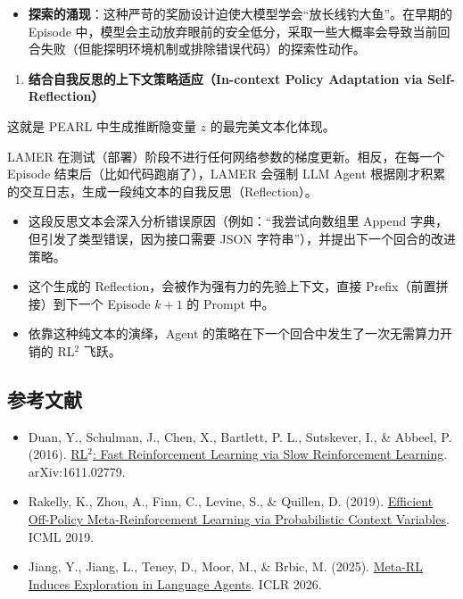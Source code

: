 \begin{itemize}
\tightlist
\item
  \textbf{探索的涌现}：这种严苛的奖励设计迫使大模型学会``放长线钓大鱼''。在早期的 Episode 中，模型会主动放弃眼前的安全低分，采取一些大概率会导致当前回合失败（但能探明环境机制或排除错误代码）的探索性动作。
\end{itemize}

\begin{enumerate}
\def\labelenumi{\arabic{enumi}.}
\setcounter{enumi}{1}
\tightlist
\item
  \textbf{结合自我反思的上下文策略适应（In-context Policy Adaptation via Self-Reflection）}
\end{enumerate}

这就是 PEARL 中生成推断隐变量 \(z\) 的最完美文本化体现。

LAMER 在测试（部署）阶段不进行任何网络参数的梯度更新。相反，在每一个 Episode 结束后（比如代码跑崩了），LAMER 会强制 LLM Agent 根据刚才积累的交互日志，生成一段纯文本的自我反思（Reflection）。

\begin{itemize}
\tightlist
\item
  这段反思文本会深入分析错误原因（例如：``我尝试向数组里 Append 字典，但引发了类型错误，因为接口需要 JSON 字符串''），并提出下一个回合的改进策略。
\item
  这个生成的 Reflection，会被作为强有力的先验上下文，直接 Prefix（前置拼接）到下一个 Episode \(k+1\) 的 Prompt 中。
\item
  依靠这种纯文本的演绎，Agent 的策略在下一个回合中发生了一次无需算力开销的 RL\(^2\) 飞跃。
\end{itemize}

\hypertarget{ux53c2ux8003ux6587ux732e-138}{%
\subsection{参考文献}\label{ux53c2ux8003ux6587ux732e-138}}

\begin{itemize}
\tightlist
\item
  Duan, Y., Schulman, J., Chen, X., Bartlett, P. L., Sutskever, I., \& Abbeel, P. (2016). \href{https://arxiv.org/abs/1611.02779}{RL\(^2\): Fast Reinforcement Learning via Slow Reinforcement Learning}. arXiv:1611.02779.
\item
  Rakelly, K., Zhou, A., Finn, C., Levine, S., \& Quillen, D. (2019). \href{https://arxiv.org/abs/1903.08254}{Efficient Off-Policy Meta-Reinforcement Learning via Probabilistic Context Variables}. ICML 2019.
\item
  Jiang, Y., Jiang, L., Teney, D., Moor, M., \& Brbic, M. (2025). \href{https://arxiv.org/abs/2512.16848}{Meta-RL Induces Exploration in Language Agents}. ICLR 2026.
\end{itemize}


